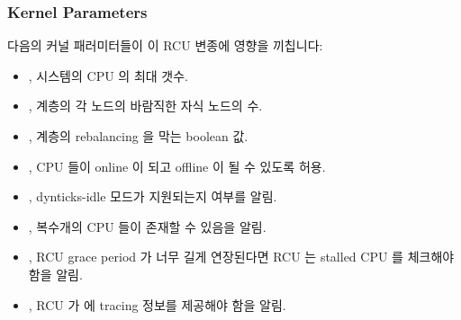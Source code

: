 \subsubsection{Kernel Parameters}
\label{app:rcuimpl:rcutreewt:Kernel Parameters}

다음의 커널 패러미터들이 이 RCU 변종에 영향을 끼칩니다:
\iffalse

The following kernel parameters affect this variant of RCU:
\fi

\begin{itemize}
\item	{}, 시스템의 CPU 의 최대 갯수.
\item	{},  계층의 각 노드의 바람직한 자식
	노드의 수.
\item	{},  계층의 rebalancing 을 막는
	boolean 값.
\item	{}, CPU 들이 online 이 되고 offline 이 될 수
	있도록 허용.
\item	{}, dynticks-idle 모드가 지원되는지 여부를 알림.
\item	{}, 복수개의 CPU 들이 존재할 수 있음을 알림.
\item	{}, RCU grace period 가 너무 길게
	연장된다면 RCU 는 stalled CPU 를 체크해야 함을 알림.
\item	{}, RCU 가  에 tracing 정보를 제공해야
	함을 알림.
\iffalse

\item	\co{NR_CPUS}, the maximum number of CPUs in the system.
\item	\co{CONFIG_RCU_FANOUT}, the desired number of children for
	each node in the \co{rcu_node} hierarchy.
\item	\co{CONFIG_RCU_FANOUT_EXACT}, a boolean preventing rebalancing
	of the \co{rcu_node} hierarchy.
\item	\co{CONFIG_HOTPLUG_CPU}, permitting CPUs to come online and go
	offline.
\item	\co{CONFIG_NO_HZ}, indicating that dynticks-idle mode is supported.
\item	\co{CONFIG_SMP}, indicating that multiple CPUs may be present.
\item	\co{CONFIG_RCU_CPU_STALL_DETECTOR}, indicating that RCU should
	check for stalled CPUs when RCU grace periods extend too long.
\item	\co{CONFIG_RCU_TRACE}, indicating that RCU should provide
	tracing information in \co{debugfs}.
\fi
\end{itemize}

